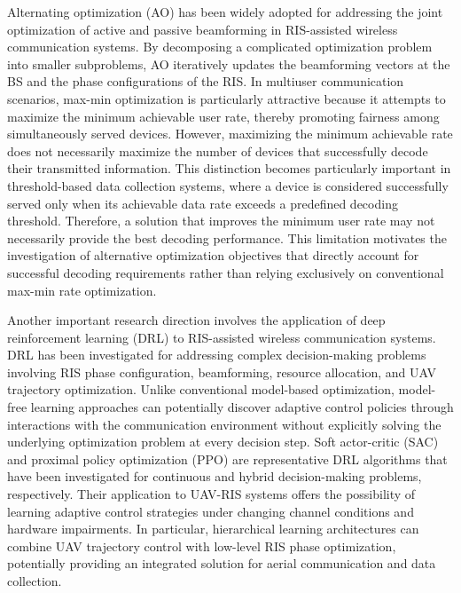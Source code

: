 \documentclass[journal]{IEEEtran}
\begin{document}
Alternating optimization (AO) has been widely adopted for addressing the joint optimization of active and passive beamforming in RIS-assisted wireless communication systems. By decomposing a complicated optimization problem into smaller subproblems, AO iteratively updates the beamforming vectors at the BS and the phase configurations of the RIS. In multiuser communication scenarios, max-min optimization is particularly attractive because it attempts to maximize the minimum achievable user rate, thereby promoting fairness among simultaneously served devices. However, maximizing the minimum achievable rate does not necessarily maximize the number of devices that successfully decode their transmitted information. This distinction becomes particularly important in threshold-based data collection systems, where a device is considered successfully served only when its achievable data rate exceeds a predefined decoding threshold. Therefore, a solution that improves the minimum user rate may not necessarily provide the best decoding performance. This limitation motivates the investigation of alternative optimization objectives that directly account for successful decoding requirements rather than relying exclusively on conventional max-min rate optimization.

Another important research direction involves the application of deep reinforcement learning (DRL) to RIS-assisted wireless communication systems. DRL has been investigated for addressing complex decision-making problems involving RIS phase configuration, beamforming, resource allocation, and UAV trajectory optimization. Unlike conventional model-based optimization, model-free learning approaches can potentially discover adaptive control policies through interactions with the communication environment without explicitly solving the underlying optimization problem at every decision step. Soft actor-critic (SAC) and proximal policy optimization (PPO) are representative DRL algorithms that have been investigated for continuous and hybrid decision-making problems, respectively. Their application to UAV-RIS systems offers the possibility of learning adaptive control strategies under changing channel conditions and hardware impairments. In particular, hierarchical learning architectures can combine UAV trajectory control with low-level RIS phase optimization, potentially providing an integrated solution for aerial communication and data collection.
\end{document}
